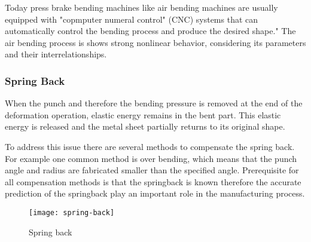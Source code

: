 
Today press brake bending machines like air bending machines are usually equipped with "copmputer numeral control" (CNC) systems that can automatically control the bending process and produce the desired shape." \cite[p. 3]{miranda_formingspringbackprediction_2018}
The air bending process is shows strong nonlinear behavior, considering its parameters and their interrelationships. \cite[p. 3]{miranda_formingspringbackprediction_2018}


\subsubsection{Spring Back} 
When the punch and therefore the bending pressure is removed at the end of the deformation operation, elastic energy remains in the bent part. This elastic energy is released and the metal sheet partially returns to its original shape. \cite[p. 113-114]{groover_fundamentalsmodernmanufacturing_2020} 

To address this issue there are several methods to compensate the spring back. For example one common method is over bending, which means that the punch angle and radius are fabricated smaller than the specified angle. 
\cite[p. 114]{groover_fundamentalsmodernmanufacturing_2020}
Prerequisite for all compensation methods is that the springback is known therefore the accurate prediction of the springback play an important role in the manufacturing process.

\begin{figure}[H]
    \centering
    \texttt{[image: spring-back]}
    \caption{Spring back \cite[p. ]{cruz_applicationmachinelearning_2021}}
    \label{fig:spring-back}
\end{figure}

